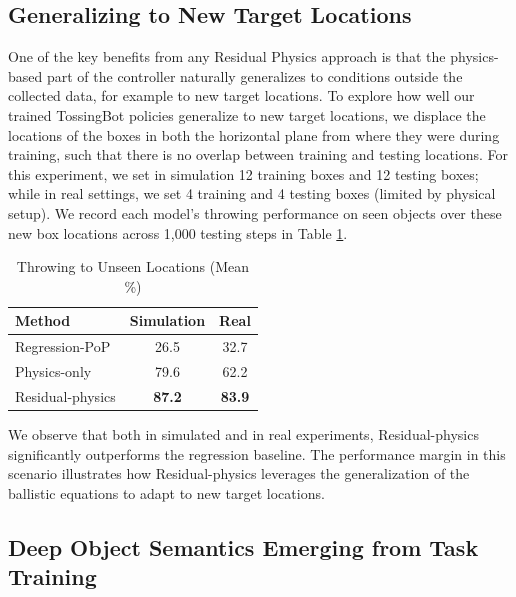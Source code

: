 \documentclass[journal]{IEEEtran}
\newcommand{\johnny}{\textcolor{green}{JL: }\textcolor{green}}
\begin{document}
\subsection{Generalizing to New Target Locations} 

One of the key benefits from any Residual Physics approach is that the physics-based part of the controller naturally generalizes to conditions outside the collected data, for example to new target locations.
To explore how well our trained TossingBot policies generalize to new target locations, we displace the locations of the boxes in both the horizontal plane from where they were during training, such that there is no overlap between training and testing locations. For this experiment, we set in simulation 12 training boxes and 12 testing boxes; while in real settings, we set 4 training and 4 testing boxes (limited by physical setup). We record each model's throwing performance on seen objects over these new box locations across 1,000 testing steps in Table \ref{table:experiments-new-locations}.

\begin{table}[h]
  \centering
  \caption{Throwing to Unseen Locations (Mean \%)}
  \vspace{-1em}
  \begin{tabular}{l c c}
  \toprule
  Method & Simulation & Real \\  
  \midrule
  Regression-PoP    & 26.5 & 32.7 \\   
  Physics-only      & 79.6 & 62.2 \\    
  Residual-physics  & \bf{87.2} & \bf{83.9} \\  
  \bottomrule
  \end{tabular}
  \label{table:experiments-new-locations}
  \vspace{-1em}
\end{table} %

We observe that both in simulated and in real experiments,  Residual-physics significantly outperforms the regression baseline. The performance margin in this scenario illustrates how Residual-physics leverages the generalization of the ballistic equations to adapt to new target locations.

\subsection{Deep Object Semantics Emerging from Task Training}
\label{sec:emerging-semantics}
\end{document}
